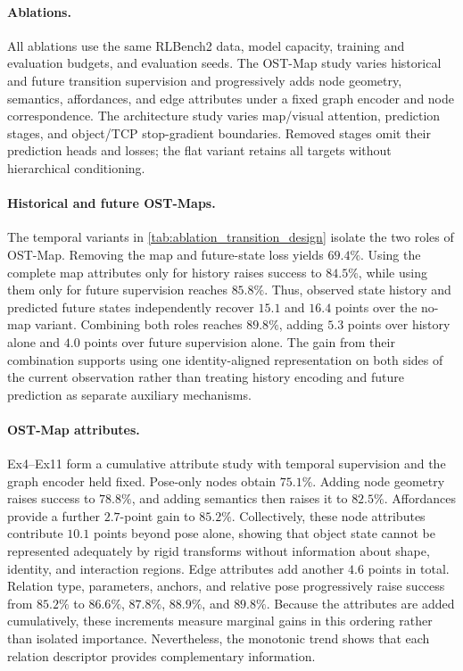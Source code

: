 \paragraph{Ablations.}
All ablations use the same RLBench2 data, model capacity, training and
evaluation budgets, and evaluation seeds. The OST-Map study varies historical
and future transition supervision and progressively adds node geometry,
semantics, affordances, and edge attributes under a fixed graph encoder and
node correspondence. The architecture study varies map/visual attention,
prediction stages, and object/TCP stop-gradient boundaries. Removed stages
omit their prediction heads and losses; the flat variant retains all targets
without hierarchical conditioning.

\paragraph{Historical and future OST-Maps.}
The temporal variants in \cref{tab:ablation_transition_design} isolate the two
roles of OST-Map. Removing the map and future-state loss yields $69.4\%$.
Using the complete map attributes only for history raises success to $84.5\%$,
while using them only for future supervision reaches $85.8\%$. Thus, observed
state history and predicted future states independently recover $15.1$ and
$16.4$ points over the no-map variant. Combining both roles reaches $89.8\%$,
adding $5.3$ points over history alone and $4.0$ points over future supervision
alone. The gain from their combination supports using one identity-aligned
representation on both sides of the current observation rather than treating
history encoding and future prediction as separate auxiliary mechanisms.

\paragraph{OST-Map attributes.}
Ex4--Ex11 form a cumulative attribute study with temporal supervision and the
graph encoder held fixed. Pose-only nodes obtain $75.1\%$. Adding node geometry
raises success to $78.8\%$, and adding semantics then raises it to $82.5\%$.
Affordances provide a further $2.7$-point gain to $85.2\%$. Collectively, these
node attributes contribute $10.1$ points beyond pose alone, showing that object
state cannot be represented adequately by rigid transforms without information
about shape, identity, and interaction regions. Edge attributes add another
$4.6$ points in total. Relation type, parameters, anchors, and relative pose
progressively raise success from $85.2\%$ to $86.6\%$, $87.8\%$, $88.9\%$,
and $89.8\%$. Because the attributes are added cumulatively, these increments
measure marginal gains in this ordering rather than isolated importance.
Nevertheless, the monotonic trend shows that each relation descriptor provides
complementary information.

